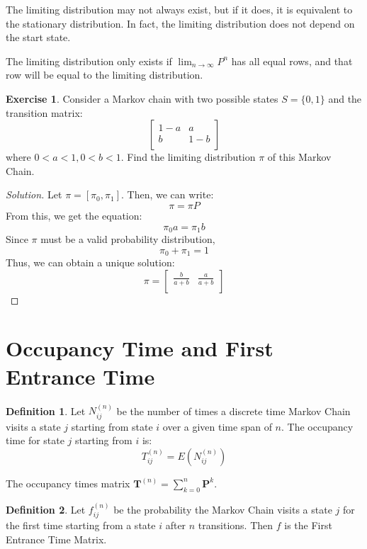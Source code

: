 \documentclass[12pt,letterpaper]{book}
\theoremstyle{definition}
\newtheorem{definition}{Definition}%
\newtheorem*{exercise}{Exercise}
\newenvironment{solution}
  {\renewcommand\qedsymbol{$\blacksquare$}\begin{proof}[Solution]}
  {\end{proof}}
\begin{document}
The limiting distribution may not always exist, but if it does, it is equivalent to the stationary distribution. In fact, the limiting distribution does not depend on the start state.

The limiting distribution only exists if $\lim_{n \rightarrow \infty} P^n$ has all equal rows, and that row will be equal to the limiting distribution.

\begin{exercise}
  Consider a Markov chain with two possible states $S = \{0,1\}$  and the transition matrix:
  \[
  \begin{bmatrix}
    1-a & a \\
    b & 1-b \\
  \end{bmatrix}
  \]
  where $0 < a < 1, 0 < b < 1$. Find the limiting distribution $\pi$ of this Markov Chain.
\end{exercise}
\begin{solution}
  Let $\pi = [\pi_0, \pi_1]$. Then, we can write:
  \[\pi = \pi P\]
  From this, we get the equation:
  \[\pi_0 a = \pi_1 b\]
  Since $\pi$ must be a valid probability distribution,
  \[\pi_0 + \pi_1 = 1\]
  Thus, we can obtain a unique solution:
  \[ \pi =  \begin{bmatrix}
  \frac{b}{a+b} & \frac{a}{a+b} \\
\end{bmatrix} \]
\end{solution}

\section{Occupancy Time and First Entrance Time}

\begin{definition}
  Let $N_{ij}^{(n)}$ be the number of times a discrete time Markov Chain visits a state $j$ starting from state $i$ over a given time span of $n$. The occupancy time for state $j$ starting from $i$ is:
  \[T_{ij}^{(n)} = E(N_{ij}^{(n)})\]
\end{definition}

\begin{theorem}
  The occupancy times matrix $\mathbf{T}^{(n)} = \sum_{k=0}^{n} \mathbf{P}^{k}$.  
\end{theorem}

\begin{definition}
  Let $f_{ij}^{(n)}$ be the probability the Markov Chain visits a state $j$ for the first time starting from a state $i$ after $n$ transitions. Then $f$ is the First Entrance Time Matrix.
\end{definition}
\end{document}
